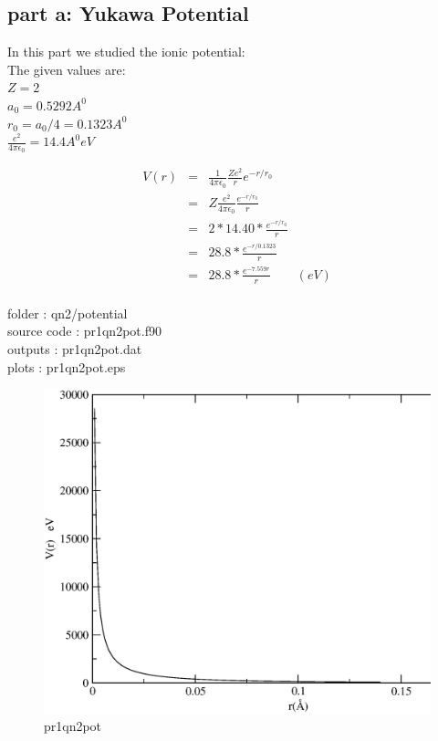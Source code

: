 \documentclass[11pt,a4paper,english]{article}
\newcommand{\no}{\nonumber}
\newcommand{\beqa}{\begin{eqnarray}}
\newcommand{\eeqa}{\end{eqnarray}}
\begin{document}
	
	\subsection{part a: Yukawa Potential}
In this part we studied the ionic potential:\\
The given values are:\\
$ Z=2 $\\
$ a_{0} = 0.5292 A^{0} $\\
$ r_{0}= a_{0}/4 = 0.1323 A^{0}$\\
$ \frac{e^{2}}{4\pi\epsilon_{0}} = 14.4 A^{0} eV $

	\beqa
	V(r) &=& \frac{1}{4\pi\epsilon_{0}} \frac{Ze^{2}}{r} e^{-r/r_{0}} \\
	 &=& Z \frac{e^{2}}{4\pi\epsilon_{0}} \frac{ e^{-r/r_{0}}}{r} \no\\
	 &=& 2 * 14.40 * \frac{ e^{-r/r_{0}}}{r}  \no\\
	 &=& 28.8 * \frac{ e^{-r/0.1323}}{r}  \no\\
	 &=& 28.8 * \frac{ e^{-7.559r}}{r} \quad\quad (eV) \no\\
	\eeqa

    folder       : qn2/potential\\
	source code  : pr1qn2pot.f90\\
	outputs      : pr1qn2pot.dat\\
	plots        : pr1qn2pot.eps\\
	
	
	\begin{figure}[h!]
	\centering
	\includegraphics [scale=0.6]{pr1qn2pot.eps}
	\caption{pr1qn2pot }
	\end{figure}
	\clearpage
	
\end{document}
